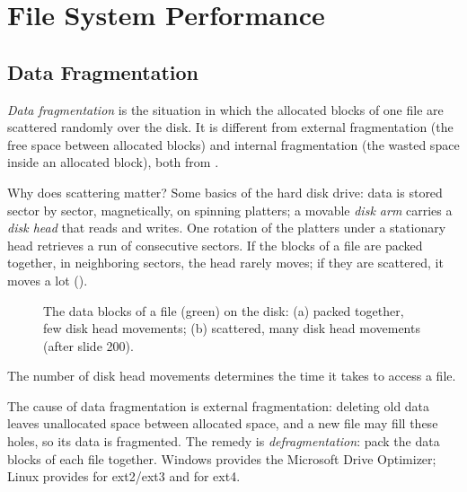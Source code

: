 \section{File System Performance}
\label{sec:fsperf}


\subsection{Data Fragmentation}

\begin{definition}
  \emph{Data fragmentation} is the situation in which the allocated blocks of one file are scattered randomly over the disk. It is different from external fragmentation (the free space between allocated blocks) and internal fragmentation (the wasted space inside an allocated block), both from .
\end{definition}

Why does scattering matter? Some basics of the hard disk drive: data is stored sector by sector, magnetically, on spinning platters; a movable \emph{disk arm} carries a \emph{disk head} that reads and writes. One rotation of the platters under a stationary head retrieves a run of consecutive sectors. If the blocks of a file are packed together, in neighboring sectors, the head rarely moves; if they are scattered, it moves a lot ().

\begin{figure}[H]
\centering
{}
\caption{The data blocks of a file (green) on the disk: (a) packed together, few disk head movements; (b) scattered, many disk head movements (after slide 200).}
\label{fig:datafrag}
\end{figure}

\begin{keypoint}
  The number of disk head movements determines the time it takes to access a file.
\end{keypoint}

The cause of data fragmentation is external fragmentation: deleting old data leaves unallocated space between allocated space, and a new file may fill these holes, so its data is fragmented. The remedy is \emph{defragmentation}: pack the data blocks of each file together. Windows provides the Microsoft Drive Optimizer; Linux provides  for ext2/ext3 and  for ext4.

